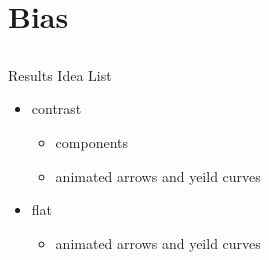 \documentclass[ xcolor = pdftex, dvipsnames, table ]{beamer}
\begin{document}
%
%
%

%
\section{Bias}
\subsection{}

\begin{frame}{\color{orange}Results Idea List}
\begin{itemize}
\item contrast
	\begin{itemize}
		\item components
		\item animated arrows and yeild curves
	\end{itemize}
\item flat
\begin{itemize}
	\item animated arrows and yeild curves
\end{itemize}
\end{itemize}
\end{frame}
\end{document}
